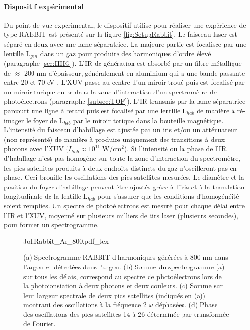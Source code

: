 \paragraph{Dispositif expérimental} Du point de vue expérimental, le dispositif utilisé pour réaliser une expérience de type RABBIT est présenté sur la figure \ref{fig:SetupRabbit}. Le faisceau laser est séparé en deux avec une lame séparatrice. La majeure partie est focalisée par une lentille L$_{gen}$ dans un gaz pour produire des harmoniques d'ordre élevé (paragraphe \ref{sec:HHG}). L'IR de génération est absorbé par un filtre métallique de $\approx$ 200 nm d'épaisseur, généralement en aluminium qui a une bande passante entre 20 et 70 eV . L'XUV passe au centre d'un miroir troué puis est focalisé par un miroir torique en or dans la zone d'interaction d'un spectromètre de photoélectrons (paragraphe \ref{subsec:TOF}). L'IR transmis par la lame séparatrice parcourt une ligne à retard puis est focalisé par une lentille L$_{hab}$ de manière à ré-imager le foyer de L$_{hab}$ par le miroir torique dans la bouteille magnétique. L'intensité du faisceau d'habillage est ajustée par un iris et/ou un atténuateur (non représenté) de manière à produire uniquement des transitions à deux photons avec l'XUV ($I_{hab} \approx 10^{11}$ W/cm$^2$). Si l'intensité ou la phase de l'IR d'habillage n'est pas homogène sur toute la zone d'interaction du spectromètre, les pics satellites produits à deux endroits distincts du gaz n'oscilleront pas en phase. Ceci brouille les oscillations des pics satellites mesurées. Le diamètre et la position du foyer d'habillage peuvent être ajustés grâce à l'iris et à la translation longitudinale de la lentille L$_{hab}$ pour s'assurer que les conditions d'homogénéité soient remplies. Un spectre de photoélectrons est mesuré pour chaque délai entre l'IR et l'XUV, moyenné sur plusieurs milliers de tirs laser (plusieurs secondes), pour former un spectrogramme.

\begin{figure}
\centering
\def\svgwidth{\columnwidth}
{JoliRabbit_Ar_800.pdf_tex}
\caption{(a) Spectrogramme RABBIT d'harmoniques générées à 800 nm dans l'argon et détectées dans l'argon. (b) Somme du spectrogramme (a) sur tous les délais, correspond au spectre de photoélectrons lors de la photoionsiation à deux photons et deux couleurs. (c) Somme sur leur largeur spectrale de deux pics satellites (indiqués en (a)) montrant des oscillations à la fréquence 2 $\omega$ déphasées. (d) Phase des oscillations des pics satellites 14 à 26 déterminée par transformée de Fourier.}
\label{fig:JoliRabbit}
\end{figure}

